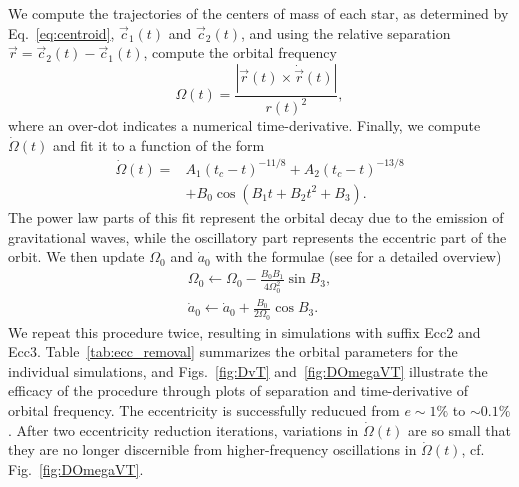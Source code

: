 {We
compute the trajectories of the centers of mass of each star, as
  determined by Eq.~\ref{eq:centroid},
$\vec c_1(t)$ and $\vec c_2(t)$, and using the relative separation
$\vec r=\vec c_2(t) - \vec c_1(t)$, compute the orbital frequency
\begin{equation}
\label{eq:Omega}
\Omega(t) = \frac{|\vec r(t)\times\dot{\vec{r}}(t)|}{r(t)^2},
\end{equation}
where an over-dot indicates a numerical time-derivative.
Finally, we compute $\dot{\Omega}(t)$ and fit it to a function of the form
\begin{align}
\dot{\Omega}(t) = & A_1(t_c-t)^{-11/8} + A_2(t_c-t)^{-13/8}\nonumber \\
&+ B_0\cos{(B_1t
  + B_2t^2 + B_3)}.
\end{align}
The power law parts of this fit represent the orbital decay due to the
emission of gravitational waves, while the oscillatory part represents
the eccentric part of the orbit. We then update $\Omega_0$ and
$\dot{a}_0$ with the formulae (see \cite{Buonanno:2010yk} for a
detailed overview)
\begin{align}
  \Omega_0 \leftarrow \Omega_0 - \frac{B_0B_1}{4\Omega_0^2}\sin B_3, \\
  \dot{a}_0\leftarrow \dot{a}_0 +\frac{B_0}{2\Omega_0}\cos B_3.
\end{align}
We repeat this procedure twice, resulting in simulations with suffix
Ecc2 and Ecc3.  Table~\ref{tab:ecc_removal} summarizes the orbital
parameters for the individual simulations, and Figs.~\ref{fig:DvT}
and~\ref{fig:DOmegaVT} illustrate the efficacy of the procedure
through plots of separation and time-derivative of orbital frequency.
The eccentricity is successfully reducued from $e\sim 1\%$ to
$\sim 0.1\%$.  After two eccentricity reduction iterations, variations
in $\dot\Omega(t)$ are so small that they are no longer discernible
from higher-frequency oscillations in $\dot\Omega(t)$,
cf. Fig.~\ref{fig:DOmegaVT}.

}
